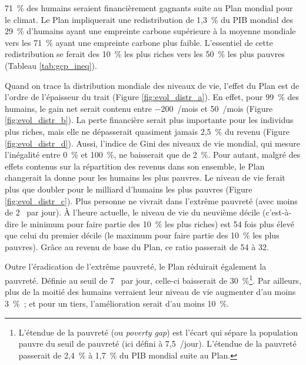 \documentclass[a5paper,french,openany]{memoir}
\begin{document}
71~\% des humains seraient financièrement gagnants suite au Plan mondial pour le climat. Le Plan impliquerait une redistribution de 1,3~\% du PIB mondial des 29~\% d'humains ayant une empreinte carbone supérieure à la moyenne mondiale vers les 71~\% ayant une empreinte carbone plus faible. L'essentiel %
de cette redistribution se ferait des 10~\% les plus riches vers les 50~\% les plus pauvres (Tableau \ref{tab:gcp_ineq}). 



Quand on trace la distribution mondiale des niveaux de vie, l'effet du Plan est de l'ordre de l'épaisseur du trait (Figure \ref{fig:evol_distr_a}). En effet, pour 99~\% des humains, le gain net serait contenu entre $-$200~\textit{\texteuro{}}/mois et 50~\textit{\texteuro{}}/mois (Figure \ref{fig:evol_distr_b}). La perte financière serait plus importante pour les individus plus riches, mais elle ne dépasserait quasiment jamais 2,5~\% du revenu (Figure \ref{fig:evol_distr_d}). Aussi, l'indice de Gini des niveaux de vie mondial, qui mesure l'inégalité entre 0~\% et 100~\%, ne baisserait que de 2~\%. 
Pour autant, malgré des effets contenus sur la répartition des revenus dans son ensemble, le Plan changerait la donne pour les humains les plus pauvres. Le niveau de vie ferait plus que doubler pour le milliard d'humains les plus pauvres (Figure \ref{fig:evol_distr_c}). Plus personne ne vivrait dans l'extrême pauvreté (avec moins de 2~\textit{\texteuro{}} par jour). 
À l'heure actuelle, le niveau de vie du %
neuvième décile (c'est-à-dire le minimum pour faire partie des 10~\% les plus riches) est 54 fois plus élevé que celui du premier %
décile (le maximum pour faire partie des 10~\% les plus pauvres). Grâce au revenu de base du Plan, ce ratio passerait de 54 à 32. 

Outre l'éradication de l'extrême pauvreté, le Plan réduirait également la pauvreté. Définie au seuil de 7~\textit{\texteuro{}} par jour, %
celle-ci baisserait de 30~\%\footnote{L'étendue de la pauvreté (ou \textit{poverty gap}) est l'écart qui sépare la population pauvre du seuil de pauvreté (ici défini à 7,5~\textit{\texteuro{}}/jour). L'étendue de la pauvreté passerait de 2,4~\% à 1,7~\% du PIB mondial suite au Plan.}. 
Par ailleurs, plus de la moitié des humains verraient leur niveau de vie augmenter d'au moins 3~\%~; et pour un tiers, l'amélioration serait d'au moins 10~\%. 
\end{document}
